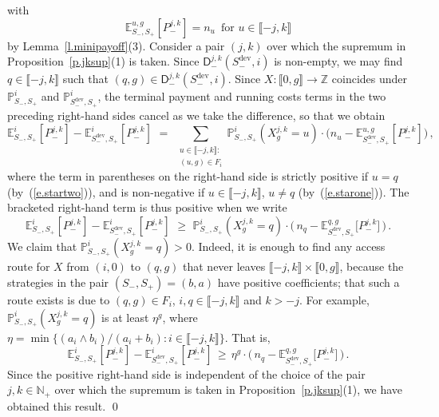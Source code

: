 \documentclass[letterpaper,11pt,oneside,reqno]{amsbook}
\newcommand{\PP}{\ensuremath{\mathbb{P}}}
\newcommand{\N}{\ensuremath{\mathbb{N}}}
\newcommand{\Z}{\ensuremath{\mathbb{Z}}}
\newcommand{\E}[0]{\mathbb{E}}
\numberwithin{figure}{chapter}
\theoremstyle{definition}
\theoremstyle{definition}
\theoremstyle{definition}
\theoremstyle{definition}
\theoremstyle{definition}
\newcommand{\nwithoutzero}{\N_+}
\newcommand\pgameplay[3]{\PP^{#3}_{#1,#2}}
\newcommand\egameplay[3]{\E^{#3}_{#1,#2}}
\newcommand{\access}{\mathsf{A}}
\newcommand{\sdev}{S_-^{\textrm{dev}}}
\begin{document}
 with
 $$
  \egameplay{S_-}{S_+}{u,g} [P_-^{j,k}] = n_u \, \, \, \textrm{for $u \in \llbracket -j,k \rrbracket$}
 $$
 by Lemma~\ref{l.minipayoff}(3).
 Consider a pair $(j,k)$ over which the supremum in Proposition~\ref{p.jksup}(1) is taken. Since $\mathsf{D}_-^{j,k}(\sdev,i)$ is non-empty, we may find
  $q \in \llbracket -j,k \rrbracket$
such that $(q,g) \in \mathsf{D}_-^{j,k}(\sdev,i)$.
 Since $X: \llbracket 0,g \rrbracket \to \Z$ coincides under $\PP_{S_-,S_+}^i$
 and $\PP_{\sdev,S_+}^i$, 
 the terminal payment and running costs terms in the two preceding right-hand sides cancel as we take the difference, so that we obtain
 $$
 \egameplay{S_-}{S_+}{i} [P_-^{j,k}] -
 \egameplay{\sdev}{S_+}{i} [P_-^{j,k}]  \, \, = \, \, \sum_{\substack{u \in \llbracket -j,k \rrbracket : \\ (u,g) \in F_i}} 
 \pgameplay{S_-}{S_+}{i}  (X^{j,k}_g = u) \cdot \Big(n_u -  \egameplay{\sdev}{S_+}{u,g} [P_-^{j,k}] \Big) \, ,
 $$
 where the term in parentheses on the right-hand side is strictly positive if $u = q$ (by~(\ref{e.startwo})), and is non-negative if $u \in \llbracket -j,k \rrbracket$, $u \not= q$ (by~(\ref{e.starone})).
 The bracketed right-hand term is thus positive when we write
 $$
 \egameplay{S_-}{S_+}{i} [P_-^{j,k}] -
 \egameplay{\sdev}{S_+}{i} [P_-^{j,k}]  \, \, \geq \, \, 
 \pgameplay{S_-}{S_+}{i}  (X^{j,k}_g = q) \cdot \Big( \, n_q -  \egameplay{\sdev}{S_+}{q,g} \big[P_-^{j,k} \big] \, \Big)  \, .
 $$
 We claim that $\pgameplay{S_-}{S_+}{i}  (X^{j,k}_g = q) > 0$.
 Indeed, it is enough to find any access route for $X$ from $(i,0)$ to $(q,g)$ that never leaves $\llbracket -j,k \rrbracket \times \llbracket 0,g \rrbracket$, because  the strategies in the pair $(S_-,S_+) = (b,a)$ have positive coefficients; that such a route exists is due to $(q,g) \in F_i$, $i,q \in \llbracket -j,k \rrbracket$ and $k >-j$.
 For example, 
 $\pgameplay{S_-}{S_+}{i}  (X^{j,k}_g = q)$ is at least $\eta^g$, where $\eta = \min \big\{ (a_i \wedge b_i)/(a_i + b_i): i \in \llbracket -j,k \rrbracket \big\}$. That is,
 $$
 \egameplay{S_-}{S_+}{i} [P_-^{j,k}] -
 \egameplay{\sdev}{S_+}{i} [P_-^{j,k}] \, \geq \, \eta^g  \cdot \Big( \, n_q -  \egameplay{\sdev}{S_+}{q,g} \big[P_-^{j,k}\big] \, \Big) \, .
 $$
 Since the positive right-hand side is independent of the choice of the pair $j,k \in \nwithoutzero$ 
 over which the supremum is taken in  Proposition~\ref{p.jksup}(1), we have obtained this result. \qed
 
\end{document}
